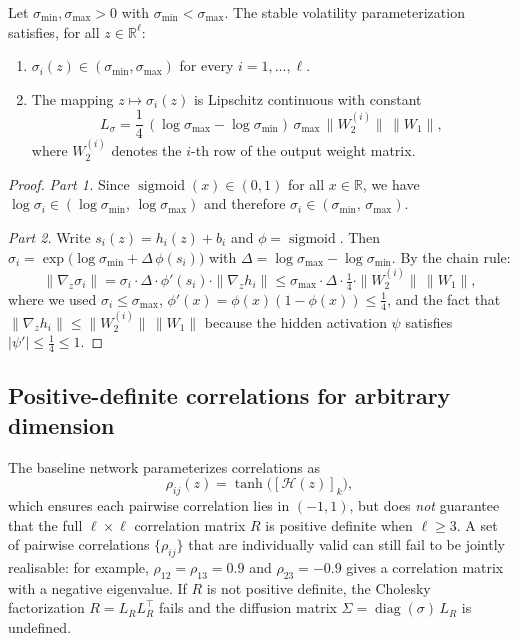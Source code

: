 \begin{proposition}
\label{prop:bounded_sigma}
Let $\sigma_{\min}, \sigma_{\max} > 0$ with $\sigma_{\min} < \sigma_{\max}$. The stable volatility parameterization satisfies, for all $z \in \mathbb{R}^\ell$:
\begin{enumerate}
    \item $\sigma_i(z) \in (\sigma_{\min}, \sigma_{\max})$ for every $i = 1,\ldots,\ell$.
    \item The mapping $z \mapsto \sigma_i(z)$ is Lipschitz continuous with constant
    \[
    L_{\sigma} = \frac{1}{4}\,(\log\sigma_{\max} - \log\sigma_{\min})\,\sigma_{\max}\,\|W_2^{(i)}\|\,\|W_1\|,
    \]
    where $W_2^{(i)}$ denotes the $i$-th row of the output weight matrix.
\end{enumerate}
\end{proposition}

\begin{proof}
\emph{Part 1.} Since $\operatorname{sigmoid}(x) \in (0,1)$ for all $x \in \mathbb{R}$, we have $\log\sigma_i \in (\log\sigma_{\min},\,\log\sigma_{\max})$ and therefore $\sigma_i \in (\sigma_{\min},\,\sigma_{\max})$.

\emph{Part 2.} Write $s_i(z) = h_i(z) + b_i$ and $\phi = \operatorname{sigmoid}$. Then $\sigma_i = \exp\!\bigl(\log\sigma_{\min} + \Delta\,\phi(s_i)\bigr)$ with $\Delta = \log\sigma_{\max} - \log\sigma_{\min}$. By the chain rule:
\[
\|\nabla_z \sigma_i\| = \sigma_i \cdot \Delta \cdot \phi'(s_i) \cdot \|\nabla_z h_i\|
\leq \sigma_{\max} \cdot \Delta \cdot \tfrac{1}{4} \cdot \|W_2^{(i)}\|\,\|W_1\|,
\]
where we used $\sigma_i \leq \sigma_{\max}$, $\phi'(x) = \phi(x)(1-\phi(x)) \leq \frac{1}{4}$, and the fact that $\|\nabla_z h_i\| \leq \|W_2^{(i)}\|\,\|W_1\|$ because the hidden activation $\psi$ satisfies $|\psi'| \leq \frac{1}{4} \leq 1$.
\end{proof}


\subsection{Positive-definite correlations for arbitrary dimension}

The baseline network parameterizes correlations as
\[
\rho_{ij}(z) = \tanh\!\bigl([\mathcal{H}(z)]_k\bigr),
\]
which ensures each pairwise correlation lies in $(-1,1)$, but does \emph{not} guarantee that the full $\ell \times \ell$ correlation matrix $R$ is positive definite when $\ell \geq 3$.
A set of pairwise correlations $\{\rho_{ij}\}$ that are individually valid can still fail to be jointly realisable: for example, $\rho_{12} = \rho_{13} = 0.9$ and $\rho_{23} = -0.9$ gives a correlation matrix with a negative eigenvalue.
If $R$ is not positive definite, the Cholesky factorization $R = L_R L_R^\top$ fails and the diffusion matrix $\Sigma = \operatorname{diag}(\sigma)\,L_R$ is undefined.

